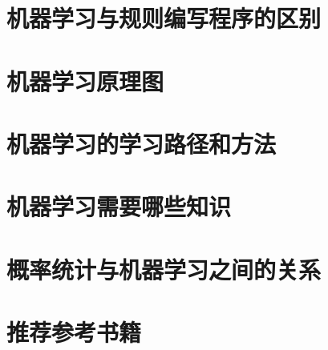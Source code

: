 \section{机器学习与规则编写程序的区别}
\section{机器学习原理图}
\section{机器学习的学习路径和方法}
\section{机器学习需要哪些知识}
\section{概率统计与机器学习之间的关系}
\section{推荐参考书籍}